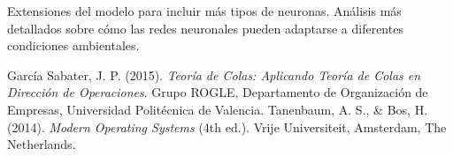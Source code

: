 \documentclass[10pt,twocolumn]{article}
\begin{document}
    Extensiones del modelo para incluir más tipos de neuronas.
    Análisis más detallados sobre cómo las redes neuronales pueden adaptarse a diferentes condiciones ambientales.



\begin{thebibliography}{9}
	
	García Sabater, J. P. (2015). \textit{Teoría de Colas: Aplicando Teoría de Colas en Dirección de Operaciones}. Grupo ROGLE, Departamento de Organización de Empresas, Universidad Politécnica de Valencia.
	Tanenbaum, A. S., \& Bos, H. (2014). \textit{Modern Operating Systems} (4th ed.). Vrije Universiteit, Amsterdam, The Netherlands.
	
	
\end{thebibliography}
\end{document}
